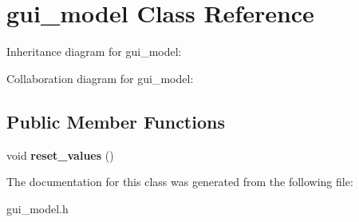 \hypertarget{classgui__model}{}\section{gui\+\_\+model Class Reference}
\label{classgui__model}


Inheritance diagram for gui\+\_\+model\+:


Collaboration diagram for gui\+\_\+model\+:
\subsection*{Public Member Functions}
\begin{DoxyCompactItemize}
\item 
void {\bfseries reset\+\_\+values} ()\hypertarget{classgui__model_a01304567de0a35af690375f76866c374}{}\label{classgui__model_a01304567de0a35af690375f76866c374}

\end{DoxyCompactItemize}


The documentation for this class was generated from the following file\+:\begin{DoxyCompactItemize}
\item 
gui\+\_\+model.\+h\end{DoxyCompactItemize}
